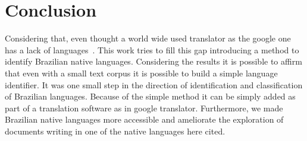 \documentclass[12pt]{article}
\begin{document}
\section{Conclusion}\label{sec:conclusion}

Considering that, even thought a world wide used translator as the google one has a lack of languages~\cite{google}.
This work tries to fill this gap introducing a method to identify Brazilian native languages.
Considering the results it is possible to affirm that even with a small text corpus it is possible to build a simple language identifier.
It was one small step in the direction of identification and classification of Brazilian languages.
Because of the simple method it can be simply added as part of a translation software as in google translator.
Furthermore, we made Brazilian native languages more accessible and ameliorate the exploration of documents writing in one of the native languages here cited.



\end{document}
